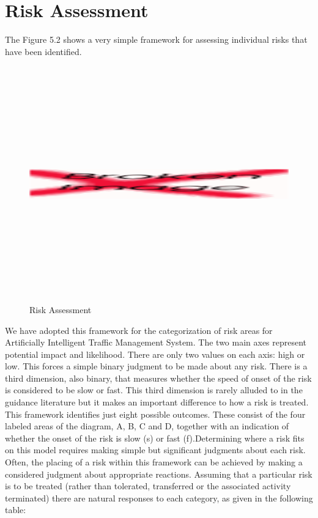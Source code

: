 \documentclass[openany,12pt]{report}
\begin{document}
\section{Risk Assessment}
\hspace*{0.5in}The Figure 5.2 shows a very simple framework for assessing individual risks that have been identified.
\newpage
\begin{figure}[H]
\centering
\includegraphics[width=5in,height=4in]{./metbkc}
\caption{Risk Assessment}
\end{figure}
\hspace*{0.5in}We have adopted this framework for the categorization of risk areas for Artificially Intelligent Traffic Management System. The two main axes represent potential impact and likelihood. There are only two values on each axis: high or low. This forces a simple binary judgment to be made about any risk. There is a third dimension, also binary, that measures whether the speed of onset of the risk is considered to be slow or fast. This third dimension is rarely alluded to in the guidance literature but it makes an important difference to how a risk is treated.\\
\hspace*{0.5in}This framework identifies just eight possible outcomes. These consist of the four labeled areas of the diagram, A, B, C and D, together with an indication of whether the onset of the risk is slow (s) or fast (f).Determining where a risk fits on this model requires making simple but significant judgments about each risk. Often, the placing of a risk within this framework can be achieved by making a considered judgment about appropriate reactions. Assuming that a particular risk is to be treated (rather than tolerated, transferred or the associated activity terminated) there are natural responses to each category, as given in the following table:
\end{document}
